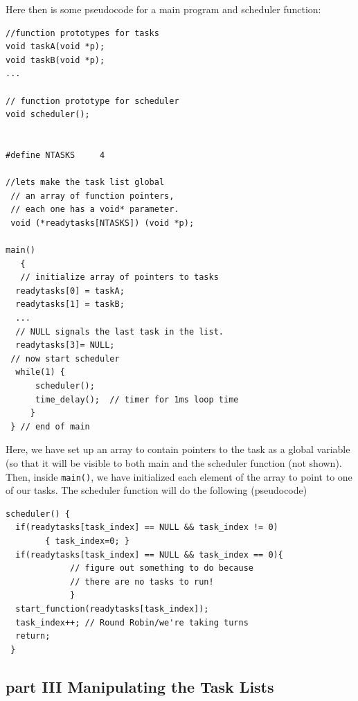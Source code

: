 Here then is some pseudocode for a main program and scheduler function:
 
\begin{verbatim}
//function prototypes for tasks
void taskA(void *p);
void taskB(void *p);
...

// function prototype for scheduler
void scheduler();


#define NTASKS     4

//lets make the task list global
 // an array of function pointers,
 // each one has a void* parameter.
 void (*readytasks[NTASKS]) (void *p);   

main()
   { 
   // initialize array of pointers to tasks
  readytasks[0] = taskA;
  readytasks[1] = taskB;
  ...
  // NULL signals the last task in the list.
  readytasks[3]= NULL;
 // now start scheduler
  while(1) {
      scheduler();
      time_delay();  // timer for 1ms loop time
     }
 } // end of main
\end{verbatim}


Here, we have set up an array to contain pointers to the task as a global variable (so that it will be visible to both main and the scheduler function (not shown). 
Then, inside {\tt main()}, we have initialized each element of the array to point to one of our tasks.   The scheduler function will do the following (pseudocode)

\begin{verbatim}
scheduler() {
  if(readytasks[task_index] == NULL && task_index != 0) 
        { task_index=0; }
  if(readytasks[task_index] == NULL && task_index == 0){
             // figure out something to do because 
             // there are no tasks to run!
             }
  start_function(readytasks[task_index]);
  task_index++; // Round Robin/we're taking turns
  return;
 }
\end{verbatim}


\subsection{part III  Manipulating the Task Lists}

